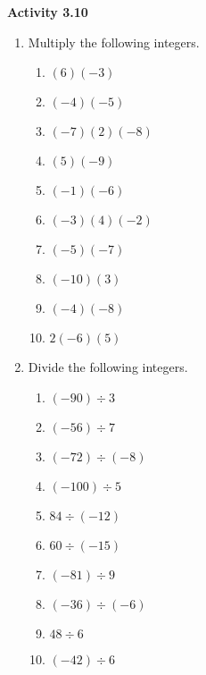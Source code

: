 \vspace{0.3ex}
\noindent\textbf{Activity 3.10}

\vspace{0.2ex}


\begin{enumerate}[noitemsep, label = \color{blue}\Alph*. ]
\item Multiply the following integers.
\begin{multicols}{2}
\begin{enumerate}[noitemsep, label = \color{blue}\arabic*. ]
\item \((6)(-3)\)
\item \((-4)(-5)\)
\item \((-7)(2)(-8)\)
\item \((5)(-9)\)
\item \((-1)(-6)\)
\item \((-3)(4)(-2)\)
\item \((-5)(-7)\)
\item \((-10)(3)\)
\item \((-4)(-8)\)
\item \(2(-6)(5)\)
\end{enumerate}
\end{multicols}

\item Divide the following integers.
\begin{multicols}{2}
\begin{enumerate}[noitemsep, label = \color{blue}\arabic*. ]
\item \((-90) \div 3\)
\item \((-56) \div 7\)
\item \((-72) \div (-8)\)
\item \((-100) \div 5\)
\item \(84 \div (-12)\)
\item \(60 \div (-15)\)
\item \((-81) \div 9\)
\item \((-36) \div (-6)\)
\item \(48 \div 6\)
\item \((-42) \div 6\)
\end{enumerate}
\end{multicols}

\end{enumerate}
